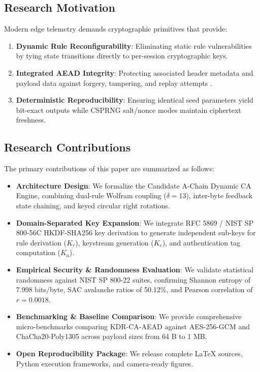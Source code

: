 \subsection{Research Motivation}
\label{subsec:motivation}
Modern edge telemetry demands cryptographic primitives that provide:
\begin{enumerate}
    \item \textbf{Dynamic Rule Reconfigurability}: Eliminating static rule vulnerabilities by tying state transitions directly to per-session cryptographic keys.
    \item \textbf{Integrated AEAD Integrity}: Protecting associated header metadata and payload data against forgery, tampering, and replay attempts \cite{bellare2000authenticated}.
    \item \textbf{Deterministic Reproducibility}: Ensuring identical seed parameters yield bit-exact outputs while CSPRNG salt/nonce modes maintain ciphertext freshness.
\end{enumerate}

\subsection{Research Contributions}
\label{subsec:contributions}
The primary contributions of this paper are summarized as follows:
\begin{itemize}
    \item \textbf{Architecture Design}: We formalize the Candidate A-Chain Dynamic CA Engine, combining dual-rule Wolfram coupling ($\delta = 13$), inter-byte feedback state chaining, and keyed circular right rotations.
    \item \textbf{Domain-Separated Key Expansion}: We integrate RFC 5869 / NIST SP 800-56C HKDF-SHA256 key derivation to generate independent sub-keys for rule derivation ($K_r$), keystream generation ($K_c$), and authentication tag computation ($K_a$).
    \item \textbf{Empirical Security & Randomness Evaluation}: We validate statistical randomness against NIST SP 800-22 suites, confirming Shannon entropy of 7.998 bits/byte, SAC avalanche ratios of 50.12\%, and Pearson correlation of $r = 0.0018$.
    \item \textbf{Benchmarking & Baseline Comparison}: We provide comprehensive micro-benchmarks comparing KDR-CA-AEAD against AES-256-GCM and ChaCha20-Poly1305 across payload sizes from 64 B to 1 MB.
    \item \textbf{Open Reproducibility Package}: We release complete LaTeX sources, Python execution frameworks, and camera-ready figures.
\end{itemize}
